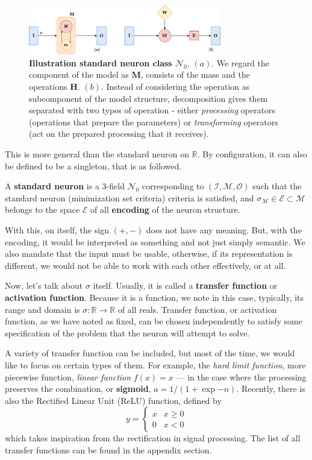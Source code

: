 \begin{figure}[!htp]
    \centering
    \includegraphics[width=0.75\textwidth]{img/generalized_sn_1.png}
    \caption{\textbf{Illustration standard neuron class $\mathcal{N}_{0}$}. $(a)$. We regard the component of the model as $\mathbf{M}$, consists of the mass and the operations $\mathbf{H}$. $(b)$. Instead of considering the operation as subcomponent of the model structure, decomposition gives them separated with two types of operation - either \textit{processing} operators (operations that prepare the parameters) or \textit{transforming} operators (act on the prepared processing that it receives).}
\end{figure}
This is more general than the standard neuron on $\mathbb{R}$. By configuration, it can also be defined to be a singleton, that is as followed. 
\begin{definition}
    A \textbf{standard neuron} is a 3-field $\mathcal{N}_{0}$ corresponding to $(\mathcal{I},\mathcal{M},\mathcal{O})$ such that the standard neuron (minimization set criteria) criteria is satisfied, and $\sigma_{\mathcal{M}}\in \mathcal{E}\subset \mathcal{M}$ belongs to the space $\mathcal{E}$ of all \textbf{encoding} of the neuron structure. 
\end{definition}

With this, on itself, the sign $(+,-)$ does not have any meaning. But, with the encoding, it would be interpreted as something and not just simply semantic. We also mandate that the input must be usable, otherwise, if its representation is different, we would not be able to work with each other effectively, or at all. 

Now, let's talk about $\sigma$ itself. Usually, it is called a \textbf{transfer function} or \textbf{activation function}. Because it is a function, we note in this case, typically, its range and domain is $\sigma:\mathbb{R}\to\mathbb{R}$ of all reals. Transfer function, or activation function, as we have noted as fixed, can be chosen independently to satisfy some specification of the problem that the neuron will attempt to solve. 

A variety of transfer function can be included, but most of the time, we would like to focus on certain types of them. For example, the \textit{hard limit function}, more piecewise function, \textit{linear function} $f(x)=x$ --- in the case where the processing preserves the combination, or \textbf{sigmoid}, $a=1/(1+\exp{-n})$. Recently, there is also the Rectified Linear Unit (ReLU) function, defined by $$y=\begin{cases}
x & x \geq 0  \\
0 & x < 0
\end{cases}$$
which takes inspiration from the rectification in signal processing. The list of all transfer functions can be found in the appendix section. 
